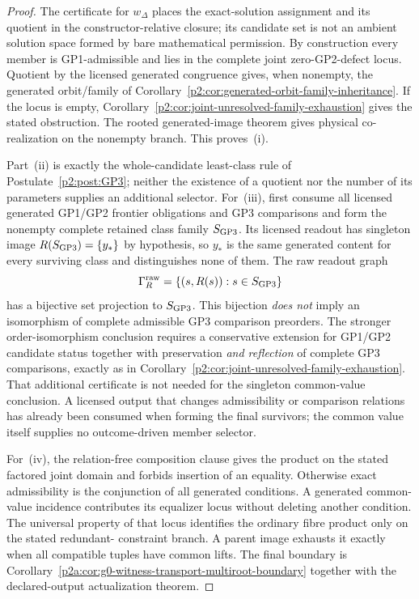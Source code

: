 \documentclass[12pt,a4paper]{article}
\begin{document}
\begin{proof}
The certificate for \(w_{\Delta}\) places the exact-solution assignment and its
quotient in the constructor-relative closure; its candidate set is not an
ambient solution space formed by bare mathematical permission.  By
construction every member is GP1-admissible and lies in the complete joint
zero-GP2-defect locus.  Quotient by the licensed generated congruence gives,
when nonempty, the generated orbit/family of
Corollary~\ref{p2:cor:generated-orbit-family-inheritance}.  If the locus is
empty, Corollary~\ref{p2:cor:joint-unresolved-family-exhaustion} gives the
stated obstruction.  The rooted generated-image theorem gives physical
co-realization on the nonempty branch.  This proves~(i).

Part~(ii) is exactly the whole-candidate least-class rule of
Postulate~\ref{p2:post:GP3}; neither the existence of a quotient nor the
number of its parameters supplies an additional selector.  For~(iii), first
consume all licensed generated GP1/GP2 frontier obligations and GP3
comparisons and form the nonempty complete retained class family
\(S_{\rm GP3}\).  Its licensed readout has singleton image
\(R(S_{\rm GP3})=\{y_*\}\) by hypothesis, so \(y_*\) is the same generated
content for every surviving class and distinguishes none of them.  The raw
readout graph
\[
 \Gamma_R^{\rm raw}=\{(s,R(s)):s\in S_{\rm GP3}\}
\]
has a bijective set projection to \(S_{\rm GP3}\).  This bijection \emph{does
not} imply an isomorphism of complete admissible GP3 comparison preorders.
The stronger order-isomorphism conclusion requires a conservative extension
for GP1/GP2 candidate status together with preservation \emph{and reflection}
of complete GP3 comparisons, exactly as in
Corollary~\ref{p2:cor:joint-unresolved-family-exhaustion}.  That additional
certificate is not needed for the singleton common-value conclusion.  A
licensed output that changes admissibility or comparison relations has
already been consumed when forming the final survivors; the common value
itself supplies no outcome-driven member selector.

For~(iv), the relation-free composition clause gives the product on
the stated factored joint domain and forbids insertion of an equality.
Otherwise exact admissibility is the conjunction of all generated
conditions. A generated common-value incidence contributes its equalizer
locus without deleting another condition. The universal property of that
locus identifies the ordinary fibre product only on the stated redundant-
constraint branch. A parent image exhausts it exactly when all compatible
tuples have common lifts. The final boundary is
Corollary~\ref{p2a:cor:g0-witness-transport-multiroot-boundary} together with
the declared-output actualization theorem.
\end{proof}
\end{document}
